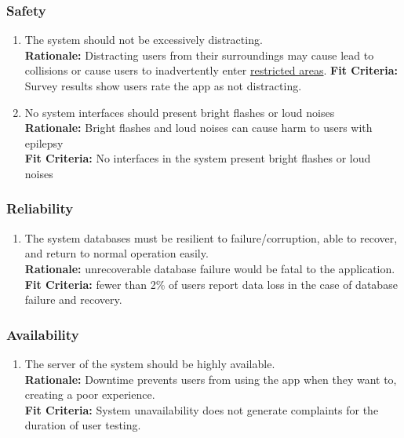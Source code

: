 \documentclass{article}
\begin{document}
\subsubsection{Safety}

\begin{enumerate}[align=left, label=\textbf{QS-SA\arabic*.}]
    \item The system should not be excessively distracting. \\
          {\bf Rationale:} Distracting users from their surroundings may cause lead to collisions or cause users to inadvertently enter \hyperref[def:restricted_area]{restricted areas}.
          {\bf Fit Criteria:} Survey results show users rate the app as not distracting.
    \item No system interfaces should present bright flashes or loud noises \\
          {\bf Rationale:} Bright flashes and loud noises can cause harm to users with epilepsy \\
          {\bf Fit Criteria:} No interfaces in the system present bright flashes or loud noises
\end{enumerate}

\subsubsection{Reliability}
\label{sub:reliability}

\begin{enumerate}[align=left, label=\textbf{QS-R\arabic*.}]
    \item The system databases must be resilient to failure/corruption, able to recover, and return to normal operation easily. \\
          {\bf Rationale:} unrecoverable database failure would be fatal to the application. \\
          {\bf Fit Criteria:} fewer than 2\% of users report data loss in the case of database failure and recovery.
\end{enumerate}


\subsubsection{Availability}
\label{sub:availability}

\begin{enumerate}[align=left, label=\textbf{QS-A\arabic*.}]

    \item The server of the system should be highly available. \\
          {\bf Rationale:} Downtime prevents users from using the app when they want to, creating a poor experience. \\
          {\bf Fit Criteria:} System unavailability does not generate complaints for the duration of user testing.
\end{enumerate}
\end{document}

